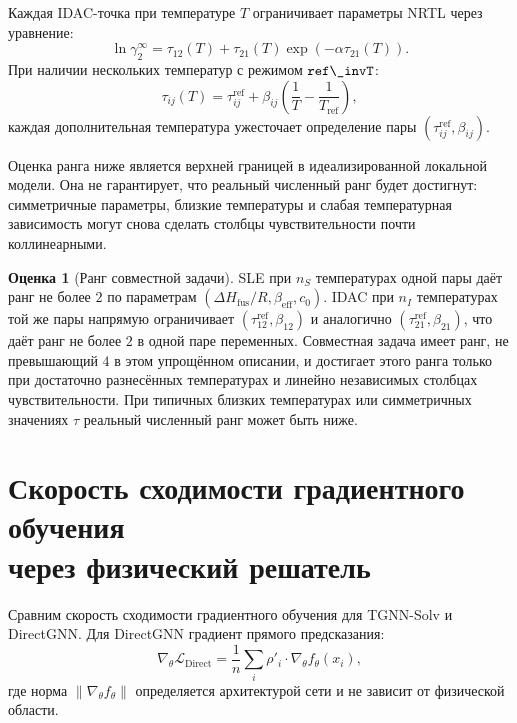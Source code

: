 \documentclass[11pt]{article}
\DeclareRobustCommand{\code}[1]{\texttt{\detokenize{#1}}}
\newcommand{\dHfus}{\Delta H_{\mathrm{fus}}}
\theoremstyle{definition}
\newtheorem{estimate}{Оценка}[section]
\begin{document}
Каждая IDAC-точка при температуре $T$ ограничивает параметры NRTL через уравнение:
\begin{equation*}
    \ln\gamma_2^\infty = \tau_{12}(T) + \tau_{21}(T) \exp(-\alpha \tau_{21}(T)).
\end{equation*}
При наличии нескольких температур с режимом $\code{ref\_invT}$:
\begin{equation}
    \tau_{ij}(T)=\tau_{ij}^{\mathrm{ref}}
    +\beta_{ij}\left(\frac{1}{T}-\frac{1}{T_{\mathrm{ref}}}\right),
\end{equation}
каждая дополнительная температура ужесточает определение пары $(\tau_{ij}^{\mathrm{ref}}, \beta_{ij})$.

Оценка ранга ниже является верхней границей в идеализированной локальной модели. Она не гарантирует, что реальный численный ранг будет достигнут: симметричные параметры, близкие температуры и слабая температурная зависимость могут снова сделать столбцы чувствительности почти коллинеарными.

\begin{estimate}[Ранг совместной задачи]
SLE при $n_S$ температурах одной пары даёт ранг не более $2$ по параметрам $(\dHfus/R, \beta_{\mathrm{eff}}, c_0)$. IDAC при $n_I$ температурах той же пары напрямую ограничивает $(\tau_{12}^{\mathrm{ref}}, \beta_{12})$ и аналогично $(\tau_{21}^{\mathrm{ref}}, \beta_{21})$, что даёт ранг не более $2$ в одной паре переменных. Совместная задача имеет ранг, не превышающий $4$ в этом упрощённом описании, и достигает этого ранга только при достаточно разнесённых температурах и линейно независимых столбцах чувствительности. При типичных близких температурах или симметричных значениях $\tau$ реальный численный ранг может быть ниже.
\end{estimate}

\section[Скорость сходимости градиентного обучения через физический решатель]{Скорость сходимости градиентного обучения\\через физический решатель}
\label{app:convergence}

Сравним скорость сходимости градиентного обучения для TGNN-Solv и DirectGNN. Для DirectGNN градиент прямого предсказания:
\begin{equation}
    \nabla_\theta \mathcal L_{\mathrm{Direct}} = \frac{1}{n}\sum_i \rho'_i \cdot \nabla_\theta f_\theta(x_i),
\end{equation}
где норма $\|\nabla_\theta f_\theta\|$ определяется архитектурой сети и не зависит от физической области.
\end{document}
